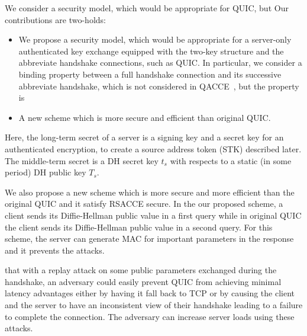 We consider a security model, which would be appropriate for QUIC, but 
Our contributions are two-holds:
\begin{itemize}
 \item{
 We propose a security model, which would be appropriate for a server-only authenticated key exchange 
 equipped with the two-key structure and the abbreviate handshake connections, such as QUIC. 
 In particular, we consider a binding property between a full handshake connection 
 and its successive abbreviate handshake, which is not considered in QACCE~\cite{LJBN15:QUIC}, but 
 the property is 
 }

 \item{A new scheme which is more secure and efficient
 than original QUIC.}
\end{itemize}



Here, the long-term secret of a server is a signing key and  
a secret key for an authenticated encryption, to create a source address token (STK)  
described later. The middle-term secret is a DH secret key $t_s$ with respects to a static (in some period) 
DH public key $T_s$.


We also propose a new scheme which is more secure and more efficient
than the original QUIC and it satisfy RSACCE secure.
In the our proposed scheme, a client sends its Diffie-Hellman public value in
a first query while in original QUIC the client sends its Diffie-Hellman
public value in a second query.
For this scheme, the server can generate MAC for important parameters in the
response and it prevents the attacks.


that with a replay attack on some
public parameters exchanged during the handshake, an
adversary could easily prevent QUIC from achieving
minimal latency advantages either by having it fall back
to TCP or by causing the client and the server to have an
inconsistent view of their handshake leading to a failure
to complete the connection.
The adversary can increase server loads using
these attacks.

